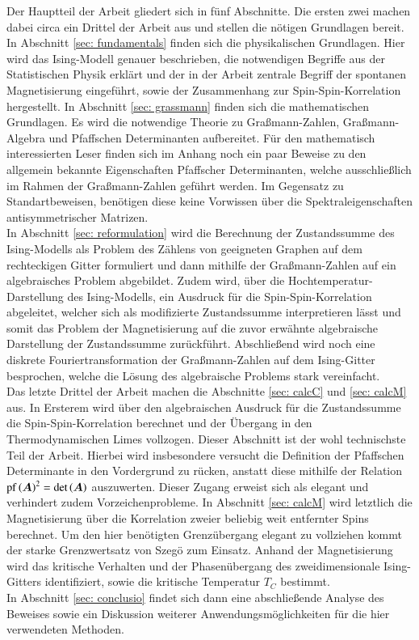 \noindent Der Hauptteil der Arbeit gliedert sich in fünf Abschnitte. Die ersten zwei machen dabei circa ein Drittel der Arbeit aus und stellen die nötigen Grundlagen bereit. In Abschnitt \ref{sec: fundamentals} finden sich die physikalischen Grundlagen. Hier wird das Ising-Modell genauer beschrieben, die notwendigen Begriffe aus der Statistischen Physik erklärt und der in der Arbeit zentrale Begriff der spontanen Magnetisierung eingeführt, sowie der Zusammenhang zur Spin-Spin-Korrelation hergestellt. In Abschnitt \ref{sec: grassmann} finden sich die mathematischen Grundlagen. Es wird die notwendige Theorie zu Graßmann-Zahlen, Graßmann-Algebra und Pfaffschen Determinanten aufbereitet. Für den mathematisch interessierten Leser finden sich im Anhang noch ein paar Beweise zu den allgemein bekannte Eigenschaften Pfaffscher Determinanten, welche ausschließlich im Rahmen der Graßmann-Zahlen geführt werden. Im Gegensatz zu Standartbeweisen, benötigen diese keine Vorwissen über die Spektraleigenschaften antisymmetrischer Matrizen. \\
In Abschnitt \ref{sec: reformulation} wird die Berechnung der Zustandssumme des Ising-Modells als Problem des Zählens von geeigneten Graphen auf dem rechteckigen Gitter formuliert und dann mithilfe der Graßmann-Zahlen auf ein algebraisches Problem abgebildet. Zudem wird, über die Hochtemperatur-Darstellung des Ising-Modells, ein Ausdruck für die Spin-Spin-Korrelation abgeleitet, welcher sich als modifizierte Zustandssumme interpretieren lässt und somit das Problem der Magnetisierung auf die zuvor erwähnte algebraische Darstellung der Zustandssumme zurückführt. Abschließend wird noch eine diskrete Fouriertransformation der Graßmann-Zahlen auf dem Ising-Gitter besprochen, welche die Lösung des algebraische Problems stark vereinfacht.\\
Das letzte Drittel der Arbeit machen die Abschnitte \ref{sec: calcC} und \ref{sec: calcM} aus. In Ersterem wird über den algebraischen Ausdruck für die Zustandssumme die Spin-Spin-Korrelation berechnet und der Übergang in den Thermodynamischen Limes vollzogen. Dieser Abschnitt ist der wohl technischste Teil der Arbeit. Hierbei wird insbesondere versucht die Definition der Pfaffschen Determinante in den Vordergrund zu rücken, anstatt diese mithilfe der Relation $\mathrm{pf}\left( \bm{A} \right)^2 = \mathrm{det}\left( \bm{A} \right)$ auszuwerten. Dieser Zugang erweist sich als elegant und verhindert zudem Vorzeichenprobleme. 
In Abschnitt \ref{sec: calcM} wird letztlich die Magnetisierung über die Korrelation zweier beliebig weit entfernter Spins berechnet. Um den hier benötigten Grenzübergang elegant zu vollziehen kommt der starke Grenzwertsatz von Szegö zum Einsatz. Anhand der Magnetisierung wird das kritische Verhalten und der Phasenübergang des zweidimensionale Ising-Gitters identifiziert, sowie die kritische Temperatur $T_C$ bestimmt.\\
In Abschnitt \ref{sec: conclusio} findet sich dann eine abschließende Analyse des Beweises sowie ein Diskussion weiterer Anwendungsmöglichkeiten für die hier verwendeten Methoden.

